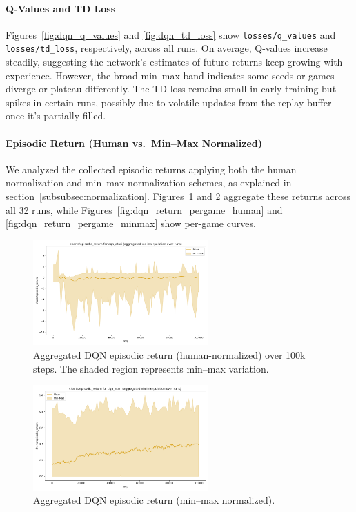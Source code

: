 \paragraph{Q-Values and TD Loss}
Figures~\ref{fig:dqn_q_values} and \ref{fig:dqn_td_loss} show \texttt{losses/q\_values} and 
\texttt{losses/td\_loss}, respectively, across all runs.
On average, Q-values increase steadily, suggesting the network's estimates 
of future returns keep growing with experience. However, 
the broad min--max band indicates some seeds or games diverge or plateau differently. 
The TD loss remains small in early training but spikes in certain runs, 
possibly due to volatile updates from the replay buffer once it's partially filled.

\paragraph{Episodic Return (Human vs.\ Min--Max Normalized)}
We analyzed the collected episodic returns applying both the human normalization and min--max normalization schemes, as explained in section~\vref{subsubsec:normalization}.
Figures~\ref{fig:dqn_return_human} and \ref{fig:dqn_return_minmax} aggregate 
these returns across all 32 runs, while 
Figures~\ref{fig:dqn_return_pergame_human} and \ref{fig:dqn_return_pergame_minmax} 
show per-game curves.

\begin{figure}
	\centering
	\includegraphics[width=0.6\textwidth]{figures/dqn/charts_episodic_return_human_dqn_atari.png}
	\caption{Aggregated DQN episodic return (human-normalized) 
		over 100k steps. The shaded region represents min--max variation.}
	\label{fig:dqn_return_human}
\end{figure}

\begin{figure}
	\centering
	\includegraphics[width=0.6\textwidth]{figures/dqn/charts_episodic_return_minmax_dqn_atari.png}
	\caption{Aggregated DQN episodic return (min--max normalized).}
	\label{fig:dqn_return_minmax}
\end{figure}

